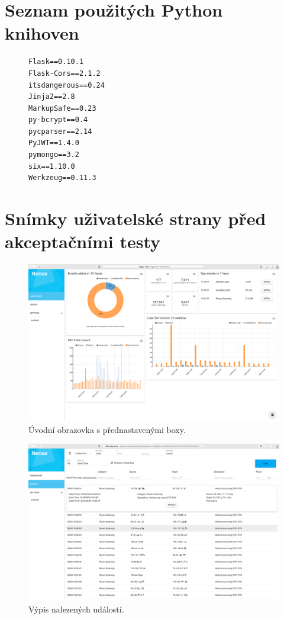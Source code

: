 \chapter{Seznam použitých Python knihoven}

\begin{figure}[ht]
\lstset{basicstyle=\small,style=JSON}
\begin{lstlisting}
Flask==0.10.1
Flask-Cors==2.1.2
itsdangerous==0.24
Jinja2==2.8
MarkupSafe==0.23
py-bcrypt==0.4
pycparser==2.14
PyJWT==1.4.0
pymongo==3.2
six==1.10.0
Werkzeug==0.11.3
\end{lstlisting}
\label{code:requirements}
\end{figure}

\chapter{Snímky uživatelské strany před akceptačními testy}
\label{screens:before}

\begin{figure}[ht]
    \centering
    \includegraphics[width=1\textwidth]{fig/screen_before_1.png}
    \caption{Úvodní obrazovka s přednastavenými boxy.} \label{screen:before:1}
\end{figure}

\begin{figure}[ht]
    \centering
    \includegraphics[width=1\textwidth]{fig/screen_before_2.png}
    \caption{Výpis nalezených událostí.} \label{screen:before:2}
\end{figure}

